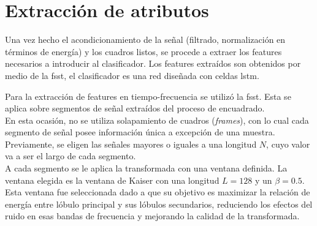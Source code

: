 \section{Extracción de atributos}

\indent Una vez hecho el acondicionamiento de la señal (filtrado, normalización en términos de energía) y los
cuadros listos, se procede a extraer los features necesarios a introducir al clasificador. Los features extraídos
son obtenidos por medio de la \acrshort{fsst}, el clasificador es una red diseñada con celdas \acrshort{lstm}. \bigskip

\indent Para la extracción de features en tiempo-frecuencia se utilizó la \acrshort{fsst}. Esta se aplica sobre
segmentos de señal extraídos del proceso de encuadrado. \\
\indent En esta ocasión, no se utiliza solapamiento de cuadros (\textit{frames}), con lo cual cada segmento de señal
posee información única a excepción de una muestra. Previamente, se eligen las señales mayores o iguales a una
longitud $N$, cuyo valor va a ser el largo de cada segmento. \\
\indent A cada segmento se le aplica la transformada con una ventana definida. La ventana elegida es la ventana de
Kaiser con una longitud $L = 128$ y un $\beta = 0.5$. Esta ventana fue seleccionada dado a que su objetivo es
maximizar la relación de energía entre lóbulo principal y sus lóbulos secundarios, reduciendo los efectos del ruido
en esas bandas de frecuencia y mejorando la calidad de la transformada.

